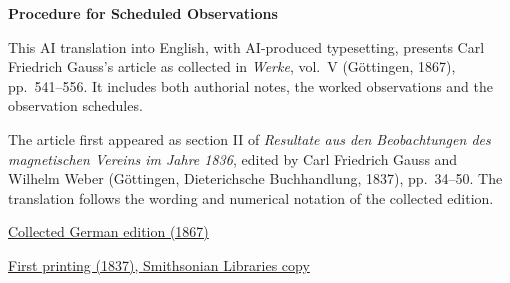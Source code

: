\clearpage
\thispagestyle{empty}
\begin{center}\Large\textbf{Procedure for Scheduled Observations}\end{center}

This AI translation into English, with AI-produced typesetting, presents Carl Friedrich Gauss’s article as collected in \textit{Werke}, vol.~V (Göttingen, 1867), pp.~541--556. It includes both authorial notes, the worked observations and the observation schedules.

The article first appeared as section II of \textit{Resultate aus den Beobachtungen des magnetischen Vereins im Jahre 1836}, edited by Carl Friedrich Gauss and Wilhelm Weber (Göttingen, Dieterichsche Buchhandlung, 1837), pp.~34--50. The translation follows the wording and numerical notation of the collected edition.

\medskip\noindent
\href{https://gdz.sub.uni-goettingen.de/id/PPN236006339}{Collected German edition (1867)}\par
\noindent\href{https://archive.org/details/ResultateausdenBd1Gaus/page/n39/mode/2up}{First printing (1837), Smithsonian Libraries copy}
\clearpage
